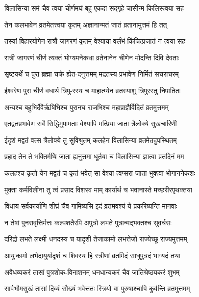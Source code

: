 \twolineshloka
{विलासिन्या समं चैव त्वया चीर्णमघं बहु}
{एकदा सद्गृहे चासीन्म किलिस्त्वया सह} %

\twolineshloka
{तेन कलभावेन व्रतमेतत्त्वया कृतम्}
{अज्ञानान्मतं जातं व्रतानामुत्तमं हि तत्} %

\twolineshloka
{तस्यां विहारयोगेन रात्रौ जागरणं कृतम्}
{वेश्याया वर्लंभं किंचित्प्रजातं न त्वया सह} %

\twolineshloka
{रात्री जागरणं चीर्ण त्यक्तं भोग्यमनेकधा}
{व्रतेनानेन चीणेन मोदन्ति दिवि देवताः} %

\twolineshloka
{सृष्टयर्थे च पुरा ब्रह्मा चक्रे ह्येत-दनुत्तमम्}
{मद्रतस्य प्रभावेण निर्मितं सचराचरम्} %

\twolineshloka
{ईश्वरेण पुरा चीर्ण वधार्थ त्रिपु-रस्य च}
{माहात्म्येन व्रतस्याशु त्रिपुरस्तु निपातितः} %

\twolineshloka
{अन्यश्च बहुभिर्देवैर्ऋषिभिश्च पुरानघ}
{राजभिश्च महाप्राज्ञैर्विदितं व्रतमुत्तमम्} %

\twolineshloka
{एतद्वतप्रभावेण सर्वे सिद्धिमुपामताः}
{वेश्यापि मत्प्रिया जाता त्रैलोक्ये सुखचारिणी} %

\twolineshloka
{ईदृशं मद्वतं वत्स त्रैलोक्ये तु सुविश्रुतम्}
{कलहेन विलासिन्या व्रतमेतदुपस्थितम्} %

\twolineshloka
{प्रहाद तेन ते भक्तिर्मथि जाता ह्यनुत्तमा}
{धूर्तया च विलासिन्या ज्ञात्वा व्रतदिनं मम} %

\twolineshloka
{कलहश्च कृतो येन मद्वतं च कृतं भवेत्}
{सा वेश्या त्वप्सरा जाता भुक्त्वा भोगाननेकशः} %

\twolineshloka
{मुक्ता कर्मविलीना तु त्वं प्रसाद विशस्व माम्}
{कार्यार्थ च भवानास्ते मच्छरीरपृथक्तया} %

\twolineshloka
{विधाय सर्वकार्याणि शीघ्रं चैव गामिष्यसि}
{इदं व्रतमवश्यं ये प्रकरिष्यन्ति मानवाः} %

\twolineshloka
{न तेषां पुनरावृत्तिर्मत्तः कल्पशतैरपि}
{अपुत्रो लभते पुत्रान्मद्भक्तश्च सुवर्चसः} %

\twolineshloka
{दरिद्रो लभते लक्ष्मी धनदस्य च यादृशी}
{तेजाकामो लभत्तेजो राज्येच्छू राज्यमुत्तमम्} %

\twolineshloka
{आयुःकामो लभेदायुर्यादृशं च शिवस्य हि}
{स्त्रीणां व्रतमिदं साधुपुत्रदं भाग्यदं तथा} %

\twolineshloka
{अवैधव्यकरं तासां पुत्रशोक-विनाशनम्}
{धनधान्यकरं चैव जातिश्रेष्ठयकरं शुभम्} %

\twolineshloka
{सार्वभौमसुखं तासां दिव्यं सौख्यं भवेत्ततः}
{स्त्रियो वा पुरुषाश्चापि कुर्वन्ति व्रतमुत्तमम्} %

